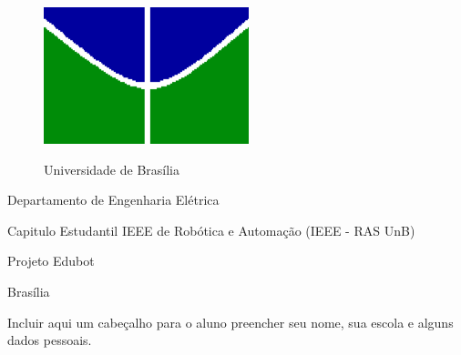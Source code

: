 \begin{figure}[h!]
    \centering
    \includegraphics[scale=0.9]{Figuras/simb_unb.png}
    \label{fig:unb}
    \caption*{Universidade de Brasília}
\end{figure}

\begin{center}
    Departamento de Engenharia Elétrica
    
    Capitulo Estudantil IEEE de Robótica e Automação (IEEE - RAS UnB)
    
    Projeto Edubot
    
    \vfill
    
    \Huge \bf \thetitle
    
    \vfill
    
    \large %
    
    Brasília \\
    \the\year %
    
    \thispagestyle{empty} %
\end{center}

\newpage
Incluir aqui um cabeçalho para o aluno preencher seu nome, sua escola e alguns dados pessoais.
\tableofcontents
\newpage

